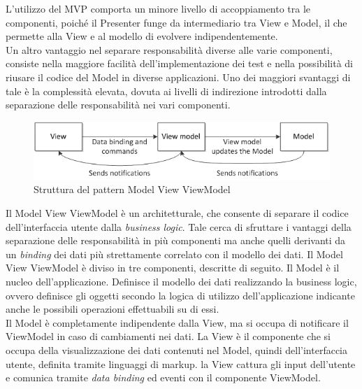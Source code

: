 		L'utilizzo del  MVP comporta un minore livello di accoppiamento tra le componenti, poiché il Presenter funge da intermediario tra View e Model, il che permette alla View e al modello di evolvere indipendentemente. \\
		Un altro vantaggio nel separare responsabilità diverse alle varie componenti, consiste nella maggiore facilità dell'implementazione dei test e nella possibilità di riusare il codice del Model in diverse applicazioni.
		Uno dei maggiori svantaggi di tale  è la complessità elevata, dovuta ai livelli di indirezione introdotti dalla separazione delle responsabilità nei vari componenti. \\


	 \label{app:MVVM}
	\begin{figure}[H]\centering
    \includegraphics[scale=0.7]{SpecificaTecnica/Pics/MVVM}
    \caption{Struttura del pattern Model View ViewModel}
	\end{figure}
	Il Model View ViewModel è un  architetturale, che consente di separare il codice dell'interfaccia utente dalla \textit{business logic}. Tale  cerca di sfruttare i vantaggi della separazione delle responsabilità in più componenti ma anche quelli derivanti da un \textit{binding} dei dati più strettamente correlato con il modello dei dati.
		Il  Model View ViewModel è diviso in tre componenti, descritte di seguito.
			Il Model è il nucleo dell'applicazione. Definisce il modello dei dati realizzando la business logic, ovvero definisce gli oggetti secondo la logica di utilizzo dell'applicazione indicante anche le possibili operazioni effettuabili su di essi.\\ 
			Il Model è completamente indipendente dalla View, ma si occupa di notificare il ViewModel in caso di cambiamenti nei dati.
			La View è il componente che si occupa della visualizzazione dei dati contenuti nel Model, quindi dell'interfaccia utente, definita tramite linguaggi di markup. la View cattura gli input dell'utente e comunica tramite \textit{data binding} ed eventi con il componente ViewModel.
